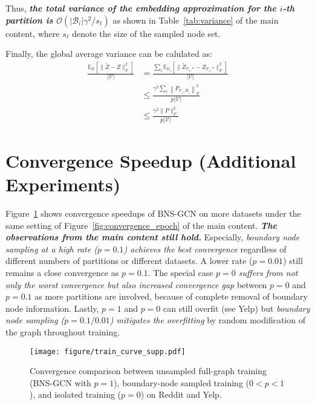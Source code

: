 \documentclass{article}
\newcommand{\expe}{\mathbb{E}}
\begin{document}
Thus, \textit{\textbf{the total variance of the embedding approximation for the $i$-th partition is $\mathcal{O}(|\mathcal{B}_i|\gamma^2/s_{\ell})$}} as shown in Table~\ref{tab:variance} of the main content, where $s_{\ell}$ denote the size of the sampled node set.

Finally, the global average variance can be calulated as:
\begin{align*}
\frac{\expe_{\mathcal{U}}[\|\tilde{Z}-Z\|_F^2]}{|\mathcal{V}|}
	&=\frac{\sum_{i}\expe_{\mathcal{U}_i}[\|\tilde{Z}_{\mathcal{V}_i,*}-Z_{\mathcal{V}_i,*}\|_F^2]}{|\mathcal{V}|} \\
	&\leq\frac{\gamma^2\sum_{i}\left\|P_{\mathcal{V}_i,\mathcal{B}_i}\right\|_F^2}{p|\mathcal{V}|} \\
	&\leq\frac{\gamma^2\|P\|_F^2}{p|\mathcal{V}|}
\end{align*}

\clearpage

\section{Convergence Speedup (Additional Experiments)}
\label{sec:additional_convergence}
Figure~\ref{fig:convergence_epoch_2} shows convergence speedups of BNS-GCN on more datasets under the same setting of Figure~\ref{fig:convergence_epoch} of the main content.
\textit{\textbf{The observations from the main content still hold.}}
Especially, \textit{boundary node sampling at a high rate ($p=0.1$) achieves the best convergence} regardless of different numbers of partitions or different datasets.
A lower rate ($p=0.01$) still remains a close convergence as $p=0.1$.
The special case \textit{$p=0$ suffers from not only the worst convergence but also increased convergence gap} between $p=0$ and $p=0.1$ as more partitions are involved, because of complete removal of boundary node information.
Lastly, $p=1$ and $p=0$ can still overfit (see Yelp) but \textit{boundary node sampling ($p=0.1/0.01$) mitigates the overfitting} by random modification of the graph throughout training.
\begin{figure}[h]
  \centering
  \texttt{[image: figure/train\_curve\_supp.pdf]}
  \caption{Convergence comparison between unsampled full-graph training (BNS-GCN with $p=1$), boundary-node sampled training ($0<p<1$), and isolated training ($p=0$) on Reddit and Yelp.}
  \label{fig:convergence_epoch_2}
\end{figure}

\clearpage
\end{document}

